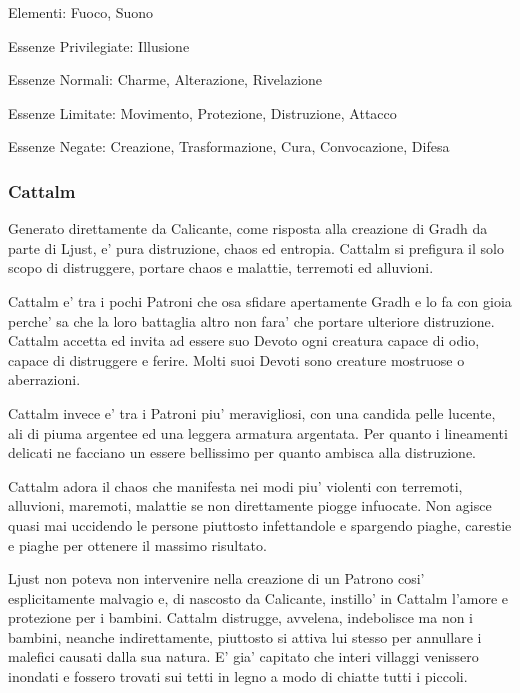 \documentclass[a4paper,11pt,twoside,openany]{dndbook}
\begin{document}
{\bigskip

Elementi: Fuoco, Suono

\bigskip

Essenze Privilegiate: Illusione

Essenze Normali: Charme, Alterazione, Rivelazione

Essenze Limitate: Movimento, Protezione, Distruzione, Attacco

Essenze Negate: Creazione, Trasformazione, Cura, Convocazione, Difesa

\subsubsection{Cattalm}

\label{cattalm}

Generato direttamente da Calicante, come risposta alla creazione di Gradh da parte di Ljust, e' pura distruzione, chaos ed entropia. Cattalm si prefigura il solo scopo di distruggere, portare chaos e malattie, terremoti ed alluvioni.

Cattalm e' tra i pochi Patroni che osa sfidare apertamente Gradh e lo fa con gioia perche' sa che la loro battaglia altro non fara' che portare ulteriore distruzione. Cattalm accetta ed invita ad essere suo Devoto ogni creatura capace di odio, capace di distruggere e ferire. Molti suoi Devoti sono creature mostruose o aberrazioni.

Cattalm invece e' tra i Patroni piu' meravigliosi, con una candida pelle lucente, ali di piuma argentee ed una leggera armatura argentata. Per quanto i lineamenti delicati ne facciano un essere bellissimo per quanto ambisca alla distruzione.

Cattalm adora il chaos che manifesta nei modi piu' violenti con terremoti, alluvioni, maremoti, malattie se non direttamente piogge infuocate. Non agisce quasi mai uccidendo le persone piuttosto infettandole e spargendo piaghe, carestie e piaghe per ottenere il massimo risultato.

Ljust non poteva non intervenire nella creazione di un Patrono cosi' esplicitamente malvagio e, di nascosto da Calicante, instillo' in Cattalm l'amore e protezione per i bambini. Cattalm distrugge, avvelena, indebolisce ma non i bambini, neanche indirettamente, piuttosto si attiva lui stesso per annullare i malefici causati dalla sua natura.
E' gia' capitato che interi villaggi venissero inondati e fossero trovati sui tetti in legno a modo di chiatte tutti i piccoli.

}
\end{document}
